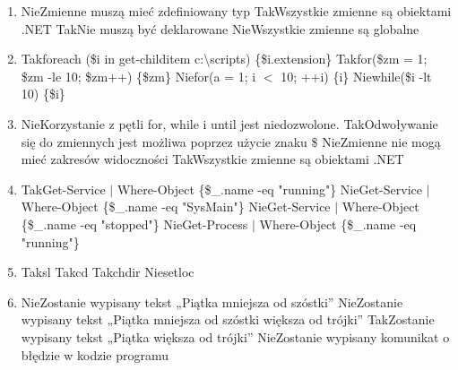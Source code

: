 \begin{enumerate}
{			----  ------------- ------ ----\\
			-a--- 2012-06-02    16:12  0 d.xyy\\
			-a--- 2012-06-02    16:12  0 e.xyy}%
		{Tak}{Directory: E:\textbackslash test\\
			Mode  LastWriteTime Length Name\\
			----  ------------- ------ ----\\
			-a--- 2012-06-02    16:12  0 e.xxy}%
		{Tak}{d.xyy\\
			e.xxy\\
			PS E:\textbackslash test$ > $}%
		{Tak}{Directory: E:\textbackslash test\textbackslash }
		
		\newpage
		\item {}%
		{Nie}{Zmienne muszą mieć zdefiniowany typ}%
		{Tak}{Wszystkie zmienne są obiektami .NET}%
		{Tak}{Nie muszą być deklarowane}%
		{Nie}{Wszystkie zmienne są globalne}
		\item {}%
		{Tak}{foreach (\$i in get-childitem c:\textbackslash scripts) \{\$i.extension\}}%
		{Tak}{for(\$zm = 1; \$zm -le 10; \$zm++) \{\$zm\}}%
		{Nie}{for(a = 1; i $ < $ 10; ++i) \{i\}}%
		{Nie}{while(\$i -lt 10) \{\$i\}}
		\item {}%
		{Nie}{Korzystanie z pętli for, while i until jest niedozwolone.}%
		{Tak}{Odwoływanie się do zmiennych jest możliwa poprzez użycie znaku \$}%
		{Nie}{Zmienne nie mogą mieć zakresów widoczności}%
		{Tak}{Wszystkie zmienne są obiektami .NET}
		\item {}%
		{Tak}{Get-Service $ \mid $ Where-Object \{\$\_.name -eq "running"\}}%
		{Nie}{Get-Service $ \mid $ Where-Object \{\$\_.name -eq "SysMain"\}}%
		{Nie}{Get-Service $ \mid $ Where-Object \{\$\_.name -eq "stopped"\}}%
		{Nie}{Get-Process $ \mid $ Where-Object \{\$\_.name -eq "running"\}}
		\item {}%
		{Tak}{sl}%
		{Tak}{cd}%
		{Tak}{chdir}%
		{Nie}{setloc}
		\item {}%
		{Nie}{Zostanie wypisany tekst „Piątka mniejsza od szóstki”}%
		{Nie}{Zostanie wypisany tekst „Piątka mniejsza od szóstki większa od trójki”}%
		{Tak}{Zostanie wypisany tekst „Piątka większa od trójki”}%
		{Nie}{Zostanie wypisany komunikat o błędzie w kodzie programu}
		

\end{enumerate}
